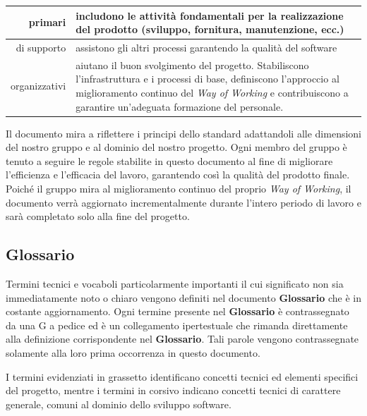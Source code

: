 \documentclass[12pt, a4paper]{article}
\begin{document}
\begin{table}[ht]
    \centering
    \renewcommand{\arraystretch}{1.3}
    \begin{tabularx}{\textwidth}{|r|X|}
        \hline
        primari & 
        includono le attività fondamentali per la realizzazione del prodotto
        (sviluppo, fornitura, manutenzione, ecc.) \\ \hline
        di supporto &
        assistono gli altri processi garantendo la qualità del software \\ \hline
        organizzativi & 
        aiutano il buon svolgimento del progetto. Stabiliscono
        l'infrastruttura e i processi di base, definiscono l'approccio al miglioramento continuo del \textit{Way of Working} e contribuiscono a garantire un'adeguata formazione del personale. \\ \hline
    \end{tabularx}
\end{table}

Il documento mira a riflettere i principi dello standard adattandoli
alle dimensioni del nostro gruppo e al dominio del nostro progetto. Ogni membro del gruppo è tenuto a seguire le regole stabilite in questo
documento al fine di migliorare l'efficienza e l'efficacia del lavoro,
garantendo così la qualità del prodotto finale. Poiché il gruppo mira al miglioramento continuo del proprio \textit{Way of Working}, il documento verrà aggiornato incrementalmente durante l'intero periodo di lavoro e sarà completato solo alla fine del progetto.

\subsection{Glossario}

Termini tecnici e vocaboli particolarmente importanti il cui
significato non sia immediatamente noto o chiaro vengono definiti nel
documento \textbf{Glossario} che è in costante aggiornamento. Ogni termine
presente nel \textbf{Glossario} è contrassegnato da una G a pedice ed è un
collegamento ipertestuale che rimanda direttamente alla definizione
corrispondente nel \textbf{Glossario}. Tali parole vengono contrassegnate
solamente alla loro prima occorrenza in questo documento.

I termini evidenziati in grassetto identificano concetti tecnici ed elementi specifici del progetto, mentre i termini in corsivo indicano concetti tecnici di carattere generale, comuni al dominio dello sviluppo software.
\end{document}

